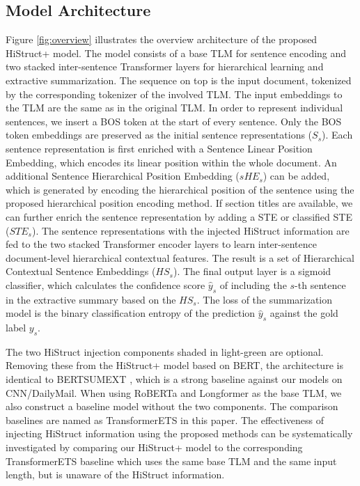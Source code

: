 \documentclass[11pt]{article}
\begin{document}
 
\subsection{Model Architecture}
\label{subsec:Model architecture}



Figure \ref{fig:overview} illustrates the overview architecture of the proposed HiStruct+ model. The model consists of a base TLM for sentence encoding and two stacked inter-sentence Transformer layers for hierarchical learning and extractive summarization. The sequence on top is the input document, tokenized by the corresponding tokenizer of the involved TLM. The input embeddings to the TLM are the same as in the original TLM. In order to represent individual sentences, we insert a BOS token at the start of every sentence. 
Only the BOS token embeddings are preserved as the initial sentence representations ($S_s$). Each sentence representation is first enriched with a Sentence Linear Position Embedding, which encodes its linear position within the whole document. An additional Sentence Hierarchical Position Embedding ($sHE_s$) can be added, which is generated by encoding the hierarchical position of the sentence using the proposed hierarchical position encoding method. If section titles are available, we can further enrich the sentence representation by adding a STE or classified STE ($STE_s$). The sentence representations with the injected HiStruct information are fed to the two stacked Transformer encoder layers to learn inter-sentence document-level hierarchical contextual features. 
The result is a set of Hierarchical Contextual Sentence Embeddings ($HS_s$). The final output layer is a sigmoid classifier, which calculates the confidence score $\hat{y}_s$ of including the $s$-th sentence in the extractive summary based on the $HS_s$. The loss of the summarization model is the binary classification entropy of the prediction $\hat{y}_s$ against the gold label $y_s$.

The two HiStruct injection components shaded in light-green are optional. Removing these from the HiStruct+ model based on BERT, the architecture is identical to BERTSUMEXT \cite{presumm}, which is a strong baseline against our models on CNN/DailyMail. When using RoBERTa and Longformer as the base TLM, we also construct a baseline model without the two components. The comparison baselines are named as TransformerETS in this paper. The effectiveness of injecting HiStruct information using the proposed methods can be systematically investigated by comparing our HiStruct+ model to the corresponding TransformerETS baseline which uses the same base TLM and the same input length, but is unaware of the HiStruct information.
\end{document}
